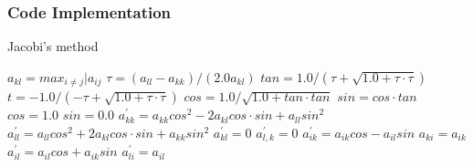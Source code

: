 \documentclass[%
oneside,                 %
final,                   %
10pt]{article}
\begin{document}
\subsubsection{Code Implementation}
\begin{algorithm}
	\caption{Jacobi's method} 
	\begin{algorithmic}[1]
			\State $a_{kl} = max_{i\neq j}|a_{ij}$
				\State	$\tau = (a_{ll}-a_{kk})/(2.0a_{kl})$
					\State $tan = 1.0 / (\tau + \sqrt{1.0 + \tau \cdot \tau})$
				\Else
					\State	$ t=-1.0 / (-\tau + \sqrt{1.0 + \tau \cdot \tau})$
				\EndIf
				\State $cos = 1.0 / \sqrt{1.0 + tan \cdot tan}$
				\State $sin = cos \cdot tan$
			\Else
				\State $cos = 1.0$
				\State $sin = 0.0$
			\EndIf	
				\State $a_{kk}^\prime = a_{kk}cos^2 - 2a_{kl} cos \cdot sin + a_{ll}sin^2$
				\State $a_{ll}^\prime = a_{ll}cos^2 + 2a_{kl} cos \cdot sin + a_{kk}sin^2$
				\State $a_{kl}^\prime = 0$ 
				\State $a_{l,k}^\prime = 0$
					\State $a_{ik}^\prime = a_{ik}cos - a_{il}sin  $
					\State $a_{ki} = a_{ik}$
					\State $a_{il}^\prime = a_{il}cos + a_{ik}sin $
					\State $a_{li}^\prime = a_{il}$
				\EndIf
			\EndFor
		\EndWhile
	\end{algorithmic} 
\end{algorithm}


\end{document}
